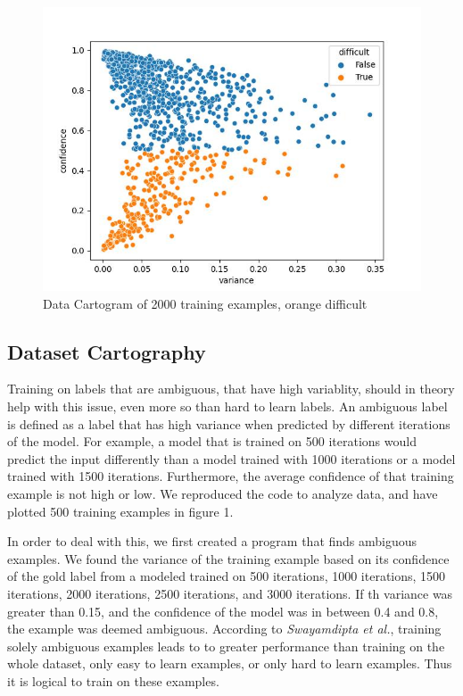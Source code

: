 \documentclass[twocolumn]{article}
\begin{document}
\begin{figure}
  \includegraphics[width=\linewidth]{./difficult.jpg}
  \caption{Data Cartogram of 2000 training examples, orange difficult}
  \label{}
\end{figure}

\subsection{Dataset Cartography}

Training on labels that are ambiguous, that have high variablity, should in
theory help with this issue, even more so than hard to learn labels. An
ambiguous label is defined as a label that has high variance when predicted by
different iterations of the model. For example, a model that is trained on 500
iterations would predict the input differently than a model trained with 1000
iterations or a model trained with 1500 iterations. Furthermore, the average
confidence of that training example is not high or low.
\cite{swayamdipta2020dataset} We reproduced the code to analyze data, and have
plotted 500 training examples in figure 1. 

In order to deal with this, we first created a program that finds ambiguous
examples. We found the variance of the training example based on its confidence
of the gold label from a modeled trained on 500 iterations, 1000 iterations,
1500 iterations, 2000 iterations, 2500 iterations, and 3000 iterations. If th
variance was greater than 0.15, and the confidence of the model was in between
0.4 and 0.8, the example was deemed ambiguous. According to \textit{Swayamdipta
et al.}, training solely ambiguous examples leads to to greater performance
than training on the whole dataset, only easy to learn examples, or only hard to
learn examples. Thus it is logical to train on these examples. 
\end{document}
